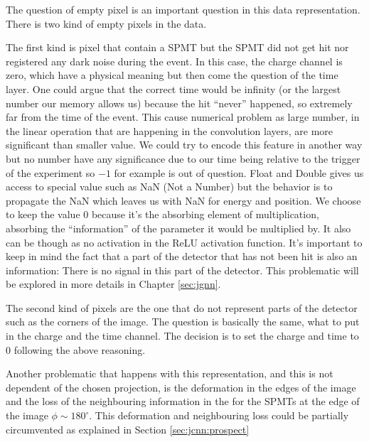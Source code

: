 \documentclass[../main.tex]{subfiles}
\begin{document}
{{\hfill

The question of empty pixel is an important question in this data representation. There is two kind of empty pixels in the data.

The first kind is pixel that contain a SPMT but the SPMT did not get hit nor registered any dark noise during the event. In this case, the charge channel is zero, which have a physical meaning but then come the question of the time layer. One could argue that the correct time would be infinity (or the largest number our memory allows us) because the hit ``never'' happened, so extremely far from the time of the event. This cause numerical problem as large number, in the linear operation that are happening in the convolution layers, are more significant than smaller value. We could try to encode this feature in another way but no number have any significance due to our time being relative to the trigger of the experiment so $-1$ for example is out of question. Float and Double gives us access to special value such as NaN (Not a Number) \cite{noauthor_ieee_2019} but the behavior is to propagate the NaN which leaves us with NaN for energy and position. We choose to keep the value 0 because it's the absorbing element of multiplication, absorbing the ``information'' of the parameter it would be multiplied by. It also can be though as no activation in the ReLU activation function. It's important to keep in mind the fact that a part of the detector that has not been hit is also an information: There is no signal in this part of the detector. This problematic will be explored in more details in Chapter \ref{sec:jgnn}.

The second kind of pixels are the one that do not represent parts of the detector such as the corners of the image. The question is basically the same, what to put in the charge and the time channel. The decision is to set the charge and time to 0 following the above reasoning.

Another problematic that happens with this representation, and this is not dependent of the chosen projection, is the deformation in the edges of the image and the loss of the neighbouring information in the for the SPMTs at the edge of the image $\phi \sim 180^\circ$. This deformation and neighbouring loss could be partially circumvented as explained in Section \ref{sec:jcnn:prospect}

}}
\end{document}
